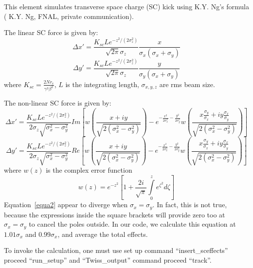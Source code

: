 \documentclass[11pt]{article}
\begin{document}
This element simulates transverse space charge (SC) kick using
K.Y. Ng's formula ( K.Y. Ng, FNAL, private communication). 

The linear SC force is given by:
\[
\Delta x'=\frac{K_{sc}Le^{-z^2/(2\sigma_z^2)}}{\sqrt{2\pi}\sigma_z}
\frac{x}{\sigma_x(\sigma_x+\sigma_y)}
\]
\begin{equation}
\Delta y'=\frac{K_{sc}Le^{-z^2/(2\sigma_z^2)}}{\sqrt{2\pi}\sigma_z}
\frac{y}{\sigma_y(\sigma_x+\sigma_y)}
\end{equation}
where $K_{sc}=\frac{2Nr_e}{\gamma^3\beta^2}$,
$L$ is the integrating length, $\sigma_{x,y,z}$ are rms beam size.

The non-linear SC force is given by:
\[
\Delta x'=\frac{K_{sc}Le^{-z^2/(2\sigma_z^2)}}{2\sigma_z\sqrt{\sigma_x^2-\sigma_y^2}}
Im\left [ w\left( \frac{x+iy}{\sqrt{2(\sigma_x^2-\sigma_y^2)}} \right)
-e^{-\frac{x^2}{2 \sigma_x^2}-\frac{y^2}{2 \sigma_y^2}}
w\left(\frac{x\frac{\sigma_y}{\sigma_x}+iy\frac{\sigma_x}{\sigma_y}}
{\sqrt{2(\sigma_x^2-\sigma_y^2)}}\right)\right ]
\]
\begin{equation}
\Delta y'=\frac{K_{sc}Le^{-z^2/(2\sigma_z^2)}}{2\sigma_z\sqrt{\sigma_x^2-\sigma_y^2}}
Re\left [ w\left( \frac{x+iy}{\sqrt{2(\sigma_x^2-\sigma_y^2)}} \right)
-e^{-\frac{x^2}{2 \sigma_x^2}-\frac{y^2}{2 \sigma_y^2}}
w\left(\frac{x\frac{\sigma_y}{\sigma_x}+iy\frac{\sigma_x}{\sigma_y}}
{\sqrt{2(\sigma_x^2-\sigma_y^2)}}\right)\right ]
\label{equa2}
\end{equation}
where $w(z)$ is the complex error function
\begin{equation}
w(z)=e^{-z^2}\left [ 1+\frac{2i}{\sqrt{\pi}}\int\limits_0^z e^{\zeta^2}d\zeta\right ]
\end{equation}
Equation~\ref{equa2} appear to diverge when $\sigma_x=\sigma_y$. In fact, this is not
true, because the expressions inside the square brackets will provide zero too at
$\sigma_x=\sigma_y$ to cancel the poles outside. In our code, we calculate this equation
at  $1.01 \sigma_x$ and $0.99\sigma_x$, and average the total effects. 
 
To invoke the calculation, one must use set up command
``insert\_sceffects'' proceed ``run\_setup'' and ``Twiss\_output''
command proceed ``track''.
\end{document}
